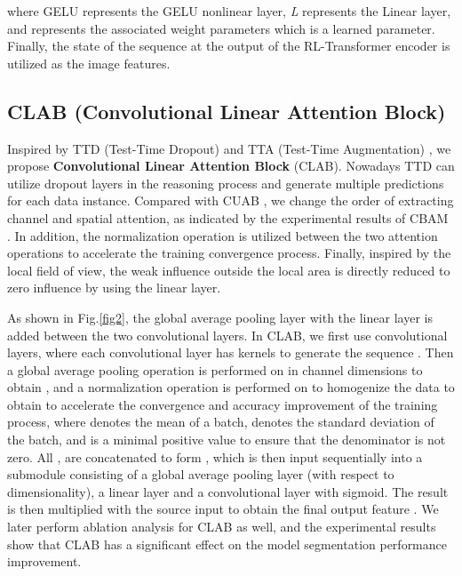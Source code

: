 \documentclass[runningheads]{llncs}
\begin{document}
where GELU represents the GELU\cite{hendrycks2016gaussian} nonlinear layer, \emph{L} represents the Linear layer, and  represents the associated weight parameters which is a learned parameter. Finally, the state of the sequence at the output of the RL-Transformer encoder is utilized as the image features.

\subsection{CLAB (Convolutional Linear Attention Block)}
\label{sec3.3}
Inspired by TTD (Test-Time Dropout) \cite{2018Aleatoric} and TTA (Test-Time Augmentation) \cite{2014Evaluation}, we propose \textbf{Convolutional Linear Attention Block} (CLAB). Nowadays TTD \cite{2018Aleatoric} can utilize dropout layers in the reasoning process and generate multiple predictions for each data instance. Compared with CUAB \cite{wang2021cuab}, we change the order of extracting channel and spatial attention, as indicated by the experimental results of CBAM \cite{woo2018cbam}. In addition, the normalization operation is utilized between the two attention operations to accelerate the training convergence process. Finally, inspired by the local field of view, the weak influence outside the local area is directly reduced to zero influence by using the linear layer.

As shown in Fig.\ref{fig2}, the global average pooling layer with the linear layer is added between the two convolutional layers. In CLAB, we first use  convolutional layers, where each convolutional layer has  kernels to generate the sequence . Then a global average pooling operation is performed on  in channel dimensions to obtain , and a normalization operation is performed on  to homogenize the data to obtain  to accelerate the convergence and accuracy improvement of the training process, where  denotes the mean of a batch,  denotes the standard deviation of the batch, and   is a minimal positive value to ensure that the denominator is not zero. All , are concatenated to form , which is then input sequentially into a submodule consisting of a global average pooling layer (with respect to dimensionality), a linear layer and a convolutional layer with sigmoid. The result is then multiplied with the source input to obtain the final output feature . We later perform ablation analysis for CLAB as well, and the experimental results show that CLAB has a significant effect on the model segmentation performance improvement.
\end{document}
